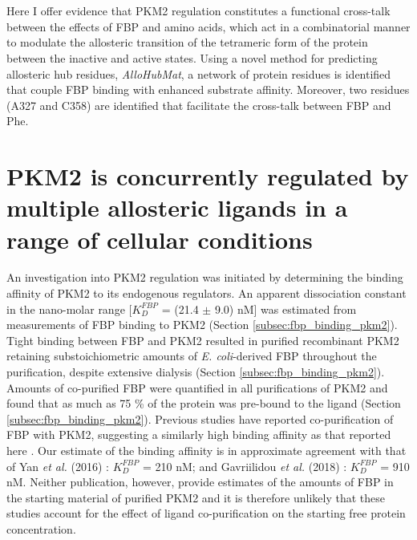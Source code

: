 %
%
\\\\
%
%
Here I offer evidence that PKM2 regulation constitutes a functional cross-talk between the effects of FBP and amino acids, which act in a combinatorial manner to modulate the allosteric transition of the tetrameric form of the protein between the inactive and active states. Using a novel method for predicting allosteric hub residues, \textit{AlloHubMat}, a network of protein residues is identified that couple FBP binding with enhanced substrate affinity. Moreover, two residues (A327 and C358) are identified that facilitate the cross-talk between FBP and Phe. 

\clearpage

\section{PKM2 is concurrently regulated by multiple allosteric ligands in a range of cellular conditions}
\label{discussion:cell_conditions}
An investigation into PKM2 regulation was initiated by determining the binding affinity of PKM2 to its endogenous regulators. An apparent dissociation constant in the nano-molar range [$K_{D}^{FBP}$ = (21.4 $\pm$ 9.0) nM] was estimated from measurements of FBP binding to PKM2 (Section \ref{subsec:fbp_binding_pkm2}). Tight binding between FBP and PKM2 resulted in purified recombinant PKM2 retaining substoichiometric amounts of \textit{E. coli}-derived FBP throughout the purification, despite extensive dialysis (Section \ref{subsec:fbp_binding_pkm2}). Amounts of co-purified FBP were quantified in all purifications of PKM2 and found that as much as 75 \% of the protein was pre-bound to the ligand (Section \ref{subsec:fbp_binding_pkm2}). Previous studies have reported co-purification of FBP with PKM2, suggesting a similarly high binding affinity as that reported here \cite{Christofk:2008aa,Morgan:2013aa,Gavriilidou:2018aa}. Our estimate of the binding affinity is in approximate agreement with that of Yan \textit{et al.} (2016) \cite{Yan:2016aa}: $K_{D}^{FBP}$ = 210 nM; and Gavriilidou \textit{et al.} (2018) \cite{Gavriilidou:2018aa}: $K_{D}^{FBP}$ = 910 nM. Neither publication, however, provide estimates of the amounts of FBP in the starting material of purified PKM2 and it is therefore unlikely that these studies account for the effect of ligand co-purification on the starting free protein concentration.
%
%
\\\\
%
%

